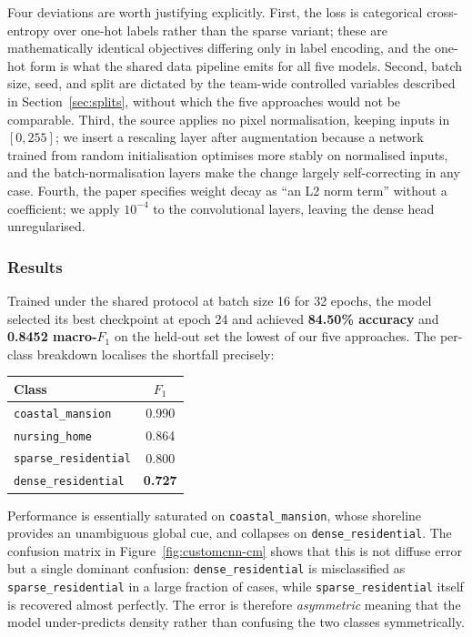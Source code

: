 \documentclass[11pt,twoside,a4paper]{article}
\begin{document}
Four deviations are worth justifying explicitly. First, the loss is categorical
cross-entropy over one-hot labels rather than the sparse variant; these are
mathematically identical objectives differing only in label encoding, and the
one-hot form is what the shared data pipeline emits for all five models.
Second, batch size, seed, and split are dictated by the team-wide controlled
variables described in Section~\ref{sec:splits}, without which the five
approaches would not be comparable. Third, the source applies no pixel
normalisation, keeping inputs in $[0,255]$; we insert a rescaling layer after
augmentation because a network trained from random initialisation optimises
more stably on normalised inputs, and the batch-normalisation layers make the
change largely self-correcting in any case. Fourth, the paper specifies weight
decay as ``an L2 norm term'' without a coefficient; we apply $10^{-4}$ to the
convolutional layers, leaving the dense head unregularised.

\subsubsection{Results}

Trained under the shared protocol at batch size 16 for 32 epochs, the model
selected its best checkpoint at epoch 24 and achieved \textbf{84.50\% accuracy}
and \textbf{0.8452 macro-$F_1$} on the held-out set the lowest of our five
approaches. The per-class breakdown localises the shortfall precisely:

\begin{center}
\small
\begin{tabular}{lc}
\toprule
Class & $F_1$ \\
\midrule
\texttt{coastal\_mansion} & 0.990 \\
\texttt{nursing\_home} & 0.864 \\
\texttt{sparse\_residential} & 0.800 \\
\texttt{dense\_residential} & \textbf{0.727} \\
\bottomrule
\end{tabular}
\end{center}

Performance is essentially saturated on \texttt{coastal\_mansion}, whose
shoreline provides an unambiguous global cue, and collapses on
\texttt{dense\_residential}. The confusion matrix in
Figure~\ref{fig:customcnn-cm} shows that this is not diffuse error but a single
dominant confusion: \texttt{dense\_residential} is misclassified as
\texttt{sparse\_residential} in a large fraction of cases, while
\texttt{sparse\_residential} itself is recovered almost perfectly. The error is
therefore \emph{asymmetric} meaning that the model under-predicts density rather than
confusing the two classes symmetrically.
\end{document}
